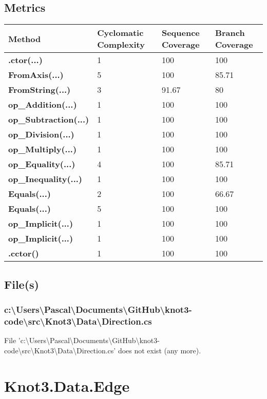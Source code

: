 \documentclass[a4paper,10pt]{article}
\begin{document}
\subsection{Metrics}
\begin{longtable}[l]{|l|l|l|l|}
\hline
\textbf{Method} & \textbf{Cyclomatic Complexity} & \textbf{Sequence Coverage} & \textbf{Branch Coverage}\\
\hline
\textbf{.ctor(...)} & 1 & 100 & 100\\
\hline
\textbf{FromAxis(...)} & 5 & 100 & 85.71\\
\hline
\textbf{FromString(...)} & 3 & 91.67 & 80\\
\hline
\textbf{op\_Addition(...)} & 1 & 100 & 100\\
\hline
\textbf{op\_Subtraction(...)} & 1 & 100 & 100\\
\hline
\textbf{op\_Division(...)} & 1 & 100 & 100\\
\hline
\textbf{op\_Multiply(...)} & 1 & 100 & 100\\
\hline
\textbf{op\_Equality(...)} & 4 & 100 & 85.71\\
\hline
\textbf{op\_Inequality(...)} & 1 & 100 & 100\\
\hline
\textbf{Equals(...)} & 2 & 100 & 66.67\\
\hline
\textbf{Equals(...)} & 5 & 100 & 100\\
\hline
\textbf{op\_Implicit(...)} & 1 & 100 & 100\\
\hline
\textbf{op\_Implicit(...)} & 1 & 100 & 100\\
\hline
\textbf{.cctor()} & 1 & 100 & 100\\
\hline
\end{longtable}
\subsection{File(s)}
\subsubsection{c:\textbackslash Users\textbackslash Pascal\textbackslash Documents\textbackslash GitHub\textbackslash knot3-code\textbackslash src\textbackslash Knot3\textbackslash Data\textbackslash Direction.cs}
 File 'c:\textbackslash Users\textbackslash Pascal\textbackslash Documents\textbackslash GitHub\textbackslash knot3-code\textbackslash src\textbackslash Knot3\textbackslash Data\textbackslash Direction.cs' does not exist (any more).
\newpage
\section{Knot3.Data.Edge}
\end{document}

